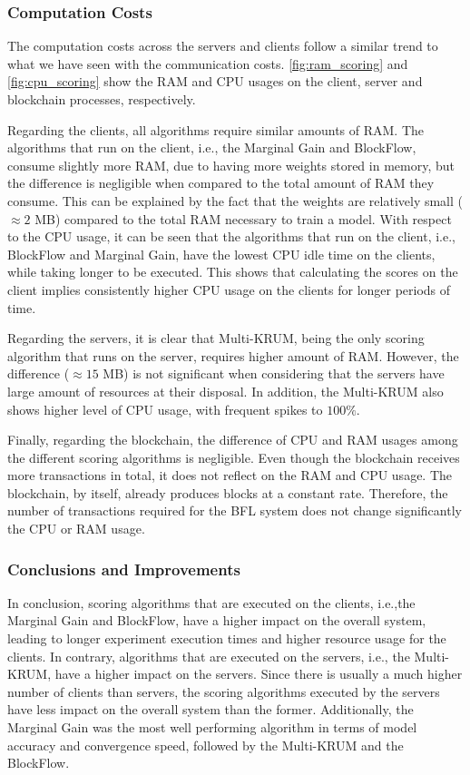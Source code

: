 \subsubsection{Computation Costs}

The computation costs across the servers and clients follow a similar trend to what we have seen with the communication costs. \autoref{fig:ram_scoring} and \autoref{fig:cpu_scoring} show the RAM and CPU usages on the client, server and blockchain processes, respectively.

Regarding the clients, all algorithms require similar amounts of RAM. The algorithms that run on the client, i.e., the Marginal Gain and BlockFlow, consume slightly more RAM, due to having more weights stored in memory, but the difference is negligible when compared to the total amount of RAM they consume. This can be explained by the fact that the weights are relatively small ($\approx 2$ MB) compared to the total RAM necessary to train a model. With respect to the CPU usage, it can be seen that the algorithms that run on the client, i.e., BlockFlow and Marginal Gain, have the lowest CPU idle time on the clients, while taking longer to be executed. This shows that calculating the scores on the client implies consistently higher CPU usage on the clients for longer periods of time.

Regarding the servers, it is clear that Multi-KRUM, being the only scoring algorithm that runs on the server, requires higher amount of RAM. However, the difference ($\approx 15$ MB) is not significant when considering that the servers have large amount of resources at their disposal. In addition, the Multi-KRUM also shows higher level of CPU usage, with frequent spikes to $100\%$.

Finally, regarding the blockchain, the difference of CPU and RAM usages among the different scoring algorithms is negligible. Even though the blockchain receives more transactions in total, it does not reflect on the RAM and CPU usage. The blockchain, by itself, already produces blocks at a constant rate. Therefore, the number of transactions required for the BFL system does not change significantly the CPU or RAM usage.

\subsubsection{Conclusions and Improvements}

In conclusion, scoring algorithms that are executed on the clients, i.e.,the Marginal Gain and BlockFlow, have a higher impact on the overall system, leading to longer experiment execution times and higher resource usage for the clients. In contrary, algorithms that are executed on the servers, i.e., the Multi-KRUM, have a higher impact on the servers. Since there is usually a much higher number of clients than servers, the scoring algorithms executed by the servers have less impact on the overall system than the former. Additionally, the Marginal Gain was the most well performing algorithm in terms of model accuracy and convergence speed, followed by the Multi-KRUM and the BlockFlow.

